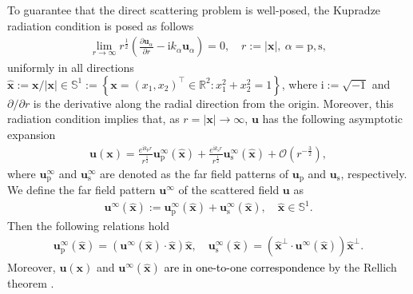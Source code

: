 \documentclass[11pt,reqno,oneside]{amsart}
\theoremstyle{definition}
\theoremstyle{remark}
\numberwithin{equation}{section}
\numberwithin{equation}{section}
\theoremstyle{remark}
\begin{document}
To guarantee that the direct scattering problem is well-posed, the Kupradze radiation condition is posed as follows
\begin{align} \label{Kupradze_radiation_condition}
	\lim\limits_{r\to \infty} r^{\frac{1}{2}} \left(\frac{\partial\mathbf{u}_{\alpha}}{\partial r} - \mathrm{i} k_\alpha \mathbf{u}_{\alpha}\right)=0, \quad r:=\vert \mathbf{x}\vert, \ \alpha=\mathrm{p},\mathrm{s},
\end{align}
uniformly in all directions $ \hat{\mathbf{x}} :=\mathbf{x}/\left|\mathbf{x}\right| \in \mathbb{S}^1 := \left\{\mathbf{x}= \left(x_1, x_2\right)^{\top} \in \mathbb{R}^2 : x_1^2 + x_2^2 = 1 \right\} $, where $ \mathrm{i} := \sqrt{-1} $ and $ \partial/\partial r $ is the derivative along the radial direction from the origin. Moreover, this radiation condition implies that, as $ r = \left| \mathbf{x} \right| \to \infty $, $ \mathbf{u} $ has the following asymptotic expansion
\begin{align*} 
	\mathbf{u}\left(\mathbf{x}\right) = \frac{e^{\mathrm{i}k_{\mathrm{p}}r}}{r^{\frac{1}{2}}} \mathbf{u}_{\mathrm{p}}^{\infty} \left(\hat{\mathbf{x}}\right) + \frac{e^{\mathrm{i}k_{\mathrm{s}}r}}{r^{\frac{1}{2}}} \mathbf{u}_{\mathrm{s}}^{\infty} \left(\hat{\mathbf{x}}\right) + \mathcal{O} \left(r^{-\frac{3}{2}}\right) ,
\end{align*}
where $ \mathbf{u}_{\mathrm{p}}^{\infty} $ and $ \mathbf{u}_{\mathrm{s}}^{\infty} $ are denoted as the far field patterns of $ \mathbf{u}_{\mathrm{p}} $ and $ \mathbf{u}_{\mathrm{s}} $, respectively. We define the far field pattern $ \mathbf{u}^{\infty} $ of the scattered field $ \mathbf{u} $ as
\begin{align} \label{def_introduction_uinfty}
	\mathbf{u}^{\infty}\left(\hat{\mathbf{x}}\right) := \mathbf{u}_{\mathrm{p}}^{\infty}\left(\hat{\mathbf{x}}\right) + \mathbf{u}_{\mathrm{s}}^{\infty}\left(\hat{\mathbf{x}}\right), \quad \hat{\mathbf{x}} \in \mathbb{S}^1 .
\end{align}
Then the following relations hold
\begin{align*}
	\mathbf{u}_{\mathrm{p}}^{\infty}\left(\hat{\mathbf{x}}\right) = \left(\mathbf{u}^{\infty}\left(\hat{\mathbf{x}}\right)\cdot\hat{\mathbf{x}}\right)\hat{\mathbf{x}}, \quad \mathbf{u}_{\mathrm{s}}^{\infty}\left(\hat{\mathbf{x}}\right) = \left(\hat{\mathbf{x}}^{\perp}\cdot\mathbf{u}^{\infty}\left(\hat{\mathbf{x}}\right)\right)\hat{\mathbf{x}}^{\perp}.
\end{align*}
Moreover, $ \mathbf{u}\left(\mathbf{x}\right) $ and $ \mathbf{u}^{\infty}\left(\hat{\mathbf{x}}\right) $ \textcolor{black}{are in one-to-one correspondence} by the Rellich theorem \cite{hahner1998acoustic}. 
\end{document}
